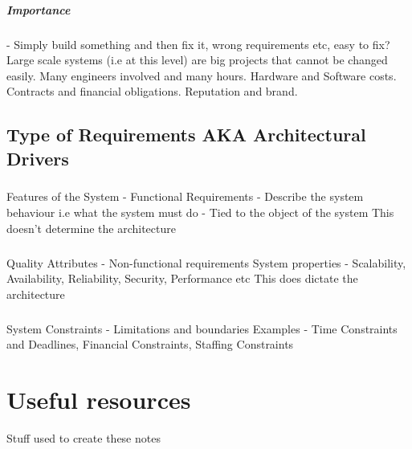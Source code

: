 \documentclass[a4paper, 11pt]{book}
\begin{document}
    \paragraph{Importance} - Simply build something and then fix it, wrong requirements etc, easy to fix?
    Large scale systems (i.e at this level) are big projects that cannot be changed easily.
    Many engineers involved and many hours.
    Hardware and Software costs.
    Contracts and financial obligations.
    Reputation and brand.


    \section{Type of Requirements AKA Architectural Drivers}

    \paragraph{}
    Features of the System - Functional Requirements - Describe the system behaviour i.e what the system must do - Tied to the object of the system
    This doesn't determine the architecture

    \paragraph{}
    Quality Attributes - Non-functional requirements
    System properties - Scalability, Availability, Reliability, Security, Performance etc
    This does dictate the architecture

    \paragraph{}
    System Constraints - Limitations and boundaries
    Examples - Time Constraints and Deadlines, Financial Constraints, Staffing Constraints


    
    
    
    
    
    
    
    
    


    \chapter{Useful resources}
    Stuff used to create these notes
\end{document}
